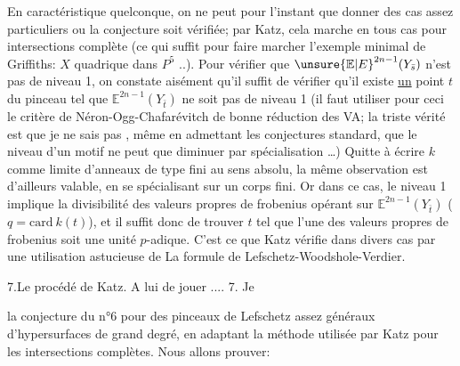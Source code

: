 En caractéristique quelconque, on ne peut pour l'instant que donner des cas assez particuliers ou la conjecture soit vérifiée; par Katz, cela marche en tous cas pour  intersections complète (ce qui suffit pour faire marcher l'exemple minimal de Griffiths: $X$ quadrique dans $P^5$ ..).  Pour vérifier que ${\unsure{\mathbb{E}|E}}^{2n-1}(Y_{\bar s})$ n'est pas de niveau 1, on constate aisément qu'il suffit de vérifier qu'il existe \uline{un} point $t$ du pinceau tel que $\mathbb{E}^{2n-1}(Y_{\bar t})$ ne soit pas de niveau 1 (il faut utiliser pour ceci le critère de Néron-Ogg-Chafarévitch de bonne réduction des VA; la triste vérité est que je ne sais pas , même en  admettant les conjectures standard, que le niveau d'un motif ne peut que diminuer par spécialisation \ldots) Quitte à écrire $k$ comme limite d'anneaux de type fini au sens absolu, la même observation est d'ailleurs valable, en se spécialisant sur un corps fini. Or dans ce cas, le niveau 1 implique la divisibilité  des valeurs propres de frobenius opérant sur $\mathbb{E}^{2n-1}(Y_{\bar t})$  ($q=\mathrm{card}\ k(t)$), et il suffit donc de trouver $t$ tel que l'une des valeurs propres de frobenius soit une unité $p$-adique. C'est ce que Katz vérifie dans divers cas par une utilisation astucieuse de La formule de Lefschetz-Woodshole-Verdier.

7.\quad Le procédé de Katz. A lui de jouer ....
7. Je \parbox[c]{3.4cm}{} la conjecture du n°6 pour des pinceaux de Lefschetz  assez généraux d'hypersurfaces de grand degré, en adaptant la méthode utilisée par Katz pour les intersections complètes. Nous allons prouver:

